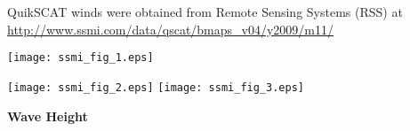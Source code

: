 \documentclass[letterpaper,12pt,oneside]{article}
\begin{document}
% 
% 
% 
% 
% 
% 
% 
% 
% 
% 
% 
QuikSCAT winds were obtained from Remote Sensing Systems (RSS) at  
\url{http://www.ssmi.com/data/qscat/bmaps_v04/y2009/m11/}

\begin{center}
\texttt{[image: ssmi\_fig\_1.eps]}

\texttt{[image: ssmi\_fig\_2.eps]}
\texttt{[image: ssmi\_fig\_3.eps]}
\end{center}

\clearpage

\begin{center}
\large\textbf{Wave Height}
\end{center}
\end{document}
